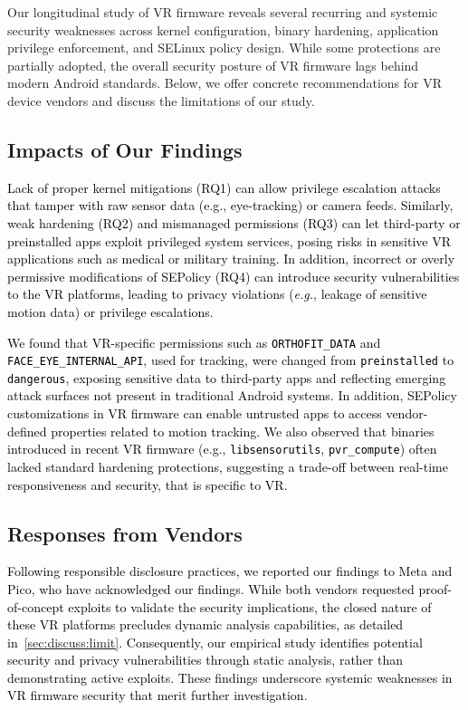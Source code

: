 \documentclass[sigconf]{acmart}
\newcommand{\cc}[1]{\mbox{\smaller[0.5]\texttt{#1}}}
\newcommand{\rev}[1]{\textcolor{black}{#1}}
\newcommand{\eg}{\emph{e.g.}\xspace}
\begin{document}
Our longitudinal study of VR firmware reveals several recurring and systemic security weaknesses across kernel configuration, binary hardening, application privilege enforcement, and SELinux policy design.
While some protections are partially adopted, the overall security posture of VR firmware lags behind modern Android standards.
Below, we offer concrete recommendations for VR device vendors and discuss the limitations of our study.

\subsection{Impacts of Our Findings}
\rev{
Lack of proper kernel mitigations (RQ1) can allow privilege escalation attacks that tamper with raw sensor data (e.g., eye-tracking) or camera feeds. Similarly, weak hardening (RQ2) and mismanaged permissions (RQ3) can let third-party or preinstalled apps exploit privileged system services, posing risks in sensitive VR applications such as medical or military training.
In addition, incorrect or overly permissive modifications of SEPolicy (RQ4)
can introduce security vulnerabilities to the VR platforms, leading to privacy violations (\eg, leakage of sensitive motion data) or privilege escalations.}

\rev{We found that VR-specific permissions such as \cc{ORTHOFIT\_DATA} and \cc{FACE\_EYE\_INTERNAL\_API}, used for tracking, were changed from \cc{preinstalled} to \cc{dangerous}, exposing sensitive data to third-party apps and reflecting emerging attack surfaces not present in traditional Android systems. In addition, SEPolicy customizations in VR firmware can enable untrusted apps to access vendor-defined properties related to motion tracking. We also observed that binaries introduced in recent VR firmware (e.g., \cc{libsensorutils}, \cc{pvr\_compute}) often lacked standard hardening protections, suggesting a trade-off between real-time responsiveness and security, that is specific to VR. }

\subsection{Responses from Vendors}
\rev{Following responsible disclosure practices, we reported our findings to Meta and Pico, who have acknowledged our findings. While both vendors requested proof-of-concept exploits to validate the security implications, the closed nature of these VR platforms precludes dynamic analysis capabilities, as detailed in~\autoref{sec:discuss:limit}. Consequently, our empirical study identifies potential security and privacy vulnerabilities through static analysis, rather than demonstrating active exploits.
These findings underscore systemic weaknesses in VR firmware security that merit further investigation.
}
\end{document}
